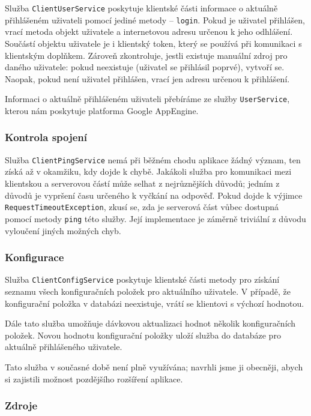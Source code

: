 Služba \verb|ClientUserService| poskytuje klientské části informace o aktuálně přihlášeném uživateli pomocí jediné metody -- \verb|login|.
Pokud je uživatel přihlášen, vrací metoda objekt uživatele a internetovou adresu určenou k jeho odhlášení.
Součástí objektu uživatele je i klientský token, který se používá při komunikaci s klientským doplňkem.
Zároveň zkontroluje, jestli existuje manuální zdroj pro daného uživatele: pokud neexistuje (uživatel se přihlásil poprvé), vytvoří se.
Naopak, pokud není uživatel přihlášen, vrací jen adresu určenou k přihlášení.

Informaci o aktuálně přihlášeném uživateli přebíráme ze služby \verb|UserService|, kterou nám poskytuje platforma Google AppEngine.

\subsubsection{Kontrola spojení}

Služba \verb|ClientPingService| nemá při běžném chodu aplikace žádný význam, ten získá až v okamžiku, kdy dojde k chybě.
Jakákoli služba pro komunikaci mezi klientskou a serverovou částí může selhat z nejrůznějších důvodů; jedním z důvodů je vypršení času určeného k vyčkání na odpověď.
Pokud dojde k výjimce \verb|RequestTimeoutException|, zkusí se, zda je serverová část vůbec dostupná pomocí metody \verb|ping| této služby.
Její implementace je záměrně triviální z důvodu vyloučení jiných možných chyb.

\subsubsection{Konfigurace}

Služba \verb|ClientConfigService| poskytuje klientské části metody pro získání seznamu všech konfiguračních položek pro aktuálního uživatele.
V případě, že konfigurační položka v databázi neexistuje, vrátí se klientovi s výchozí hodnotou.

Dále tato služba umožňuje dávkovou aktualizaci hodnot několik konfiguračních položek.
Novou hodnotu konfigurační položky uloží služba do databáze pro aktuálně přihlášeného uživatele.

Tato služba v současné době není plně využívána; navrhli jsme ji obecněji, abych si zajistili možnost pozdějšího rozšíření aplikace.

\subsubsection{Zdroje}

